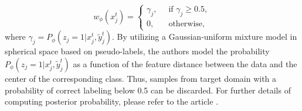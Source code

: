 $$
w_\phi(x_j^t) = \left\{\begin{split}
\gamma_j,& \;\; \text{if } \gamma_j \geq 0.5,\\
0,& \;\; \text{otherwise},
\end{split}\right.
$$
where $\gamma_j = P_\phi(z_j = 1| x_j^t, \tilde{y}_j^t)$. By utilizing a Gaussian-uniform mixture model in spherical space based on pseudo-labels, the authors model the probability $P_\phi(z_j = 1| x_j^t, \tilde{y}_j^t)$ as a function of the feature distance between the data and the center of the corresponding class. Thus, samples from target domain with a probability of correct labeling below 0.5 can be discarded. For further details of computing posterior probability, please refer to the article \cite{gu2020spherical}.  